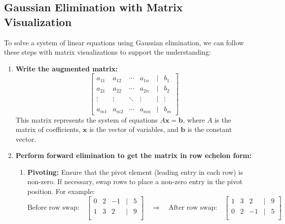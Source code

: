 \subsection{Gaussian Elimination with Matrix Visualization}
\begin{process}
    To solve a system of linear equations using Gaussian elimination, we can follow these steps with matrix visualizations to support the understanding:

    \begin{enumerate}
        \item \textbf{Write the augmented matrix:}
        \[
        \begin{bmatrix}
        a_{11} & a_{12} & \cdots & a_{1n} & | & b_1 \\
        a_{21} & a_{22} & \cdots & a_{2n} & | & b_2 \\
        \vdots & \vdots & \ddots & \vdots & | & \vdots \\
        a_{m1} & a_{m2} & \cdots & a_{mn} & | & b_m
        \end{bmatrix}
        \]
        This matrix represents the system of equations \( A\mathbf{x} = \mathbf{b} \), where \( A \) is the matrix of coefficients, \( \mathbf{x} \) is the vector of variables, and \( \mathbf{b} \) is the constant vector.
    
        \item \textbf{Perform forward elimination to get the matrix in row echelon form:}
        \begin{enumerate}
            \item \textbf{Pivoting:} Ensure that the pivot element (leading entry in each row) is non-zero. If necessary, swap rows to place a non-zero entry in the pivot position. For example:
            \[
            \text{Before row swap:} \quad \begin{bmatrix}
            0 & 2 & -1 & | & 5 \\
            1 & 3 & 2 & | & 9 \\
            \end{bmatrix}
            \quad \Rightarrow \quad \text{After row swap:} \quad \begin{bmatrix}
            1 & 3 & 2 & | & 9 \\
            0 & 2 & -1 & | & 5 \\
            \end{bmatrix}
            \]
            

\end{enumerate}
\end{enumerate}
\end{process}
